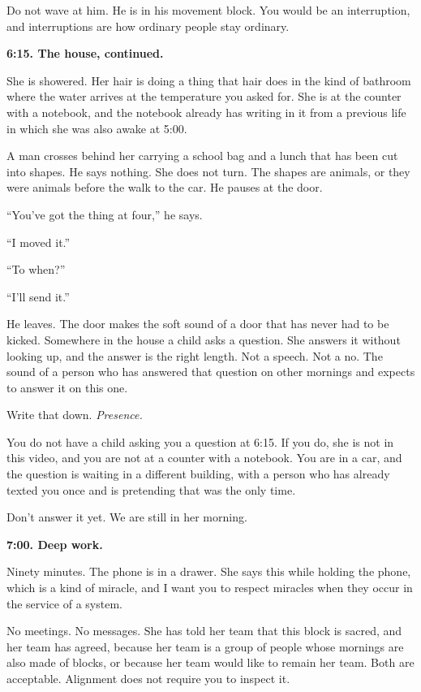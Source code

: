 \documentclass[11pt,oneside]{book}
\begin{document}
Do not wave at him. He is in his movement block. You would be an interruption, and interruptions are how ordinary people stay ordinary.

\textbf{6:15. The house, continued.}

She is showered. Her hair is doing a thing that hair does in the kind of bathroom where the water arrives at the temperature you asked for. She is at the counter with a notebook, and the notebook already has writing in it from a previous life in which she was also awake at 5:00.

A man crosses behind her carrying a school bag and a lunch that has been cut into shapes. He says nothing. She does not turn. The shapes are animals, or they were animals before the walk to the car. He pauses at the door.

``You've got the thing at four,'' he says.

``I moved it.''

``To when?''

``I'll send it.''

He leaves. The door makes the soft sound of a door that has never had to be kicked. Somewhere in the house a child asks a question. She answers it without looking up, and the answer is the right length. Not a speech. Not a no. The sound of a person who has answered that question on other mornings and expects to answer it on this one.

Write that down. \emph{Presence.}

You do not have a child asking you a question at 6:15. If you do, she is not in this video, and you are not at a counter with a notebook. You are in a car, and the question is waiting in a different building, with a person who has already texted you once and is pretending that was the only time.

Don't answer it yet. We are still in her morning.

\textbf{7:00. Deep work.}

Ninety minutes. The phone is in a drawer. She says this while holding the phone, which is a kind of miracle, and I want you to respect miracles when they occur in the service of a system.

No meetings. No messages. She has told her team that this block is sacred, and her team has agreed, because her team is a group of people whose mornings are also made of blocks, or because her team would like to remain her team. Both are acceptable. Alignment does not require you to inspect it.
\end{document}
